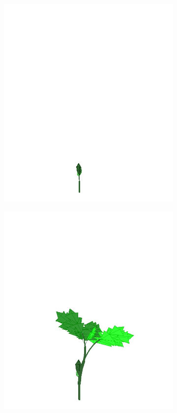 \begin{figure}[ht]
	\centering
	\begin{subfigure}{.24\textwidth}
		\centering
		\includegraphics[width=\linewidth]{plantAging001.jpg}
		\label{fig:sub1}
	\end{subfigure}
	\begin{subfigure}{.24\textwidth}
		\centering
		\includegraphics[width=\linewidth]{plantAging002.jpg}

\end{subfigure}
\end{figure}
